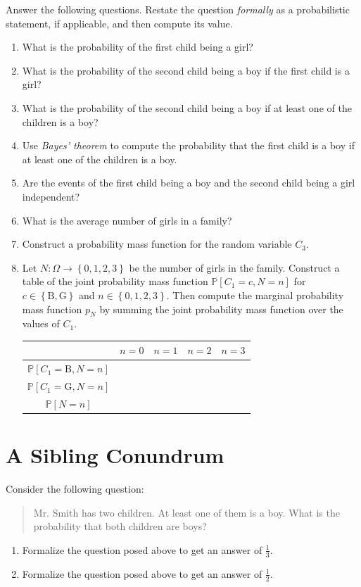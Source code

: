 \documentclass[letterpaper]{article}
\begin{document}
Answer the following questions. Restate the question \emph{formally} as a probabilistic statement, if applicable, and then compute its value.
\begin{enumerate}
\item What is the probability of the first child being a girl?
\item What is the probability of the second child being a boy if the first child is a girl?
\item What is the probability of the second child being a boy if at least one of the children is a boy?
\item Use \emph{Bayes' theorem} to compute the probability that the first child is a boy if at least one of the children is a boy.
\item Are the events of the first child being a boy and the second child being a girl independent?
\item What is the average number of girls in a family?
\item Construct a probability mass function for the random variable $C_3$.
\item Let $N\colon \Omega \to \left\{ 0,1,2,3 \right\}$ be the number of girls in the family. Construct a table of the joint probability mass function $\mathbb{P}[C_1 = c, N = n]$ for $c \in \left\{ \mathrm{B}, \mathrm{G} \right\}$ and $n \in \left\{ 0,1,2,3 \right\}$. Then compute the marginal probability mass function $p_N$ by summing the joint probability mass function over the values of $C_1$.
\begin{center}
\renewcommand{\arraystretch}{1.5}
\setlength{\tabcolsep}{12pt}
\begin{tabular}{c|c|c|c|c}
  & $n = 0$ & $n = 1$ & $n = 2$ & $n = 3$ \\
  \hline
  $\mathbb{P}[C_1 = \mathrm{B}, N = n]$ & & & & \\
  \hline
  $\mathbb{P}[C_1 = \mathrm{G}, N = n]$ & & & & \\
  \hline
  \hline
  $\mathbb{P}[N = n]$ & & & & \\
\end{tabular}
\end{center}
\end{enumerate}


\section{A Sibling Conundrum}

Consider the following question:
\begin{quote}
  Mr. Smith has two children. At least one of them is a boy. What is the probability that both children are boys?
\end{quote}
\begin{enumerate}
\item Formalize the question posed above to get an answer of $\frac{1}{3}$.
\item Formalize the question posed above to get an answer of $\frac{1}{2}$.
\end{enumerate}
\end{document}

